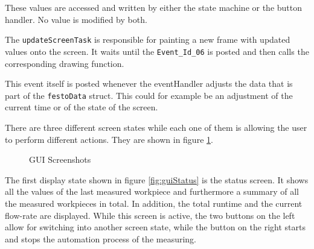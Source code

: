 These values are accessed and written by either the state machine or the button handler. No value is modified by both. 


The \texttt{updateScreenTask} is responsible for painting a new frame with updated values onto the screen.
It waits until the \texttt{Event\_Id\_06} is posted and then calls the corresponding drawing function.

This event itself is posted whenever the eventHandler adjusts the data that is part of the \texttt{festoData} struct.
This could for example be an adjustment of the current time or of the state of the screen.

There are three different screen states while each one of them is allowing the user to perform different actions. They are shown in figure \ref{fig:gui}.

\begin{figure} [H] 	
	\begin{center}
		\quad
		\quad
		\caption{GUI Screenshots}
		\label{fig:gui}
	\end{center}
\end{figure} 

The first display state shown in figure \ref{fig:guiStatus} is the status screen.
It shows all the values of the last measured workpiece and furthermore a summary of all the measured workpieces in total.
In addition, the total runtime and the current flow-rate are displayed.
While this screen is active, the two buttons on the left allow for %
 switching into another screen state, while the button on the right starts and stops the automation process of the measuring. %

